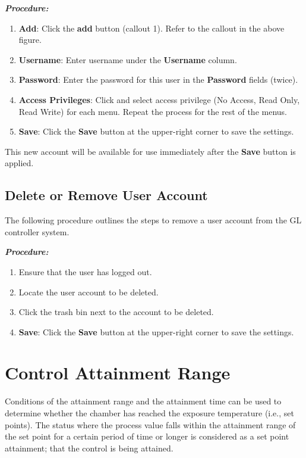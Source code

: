 \textbf{\emph{Procedure:}}

\begin{enumerate}
\def\labelenumi{\arabic{enumi}.}
\tightlist
\item
  \textbf{Add}: Click the \textbf{add} button (callout 1). Refer to the
  callout in the above figure.\\
\item
  \textbf{Username}: Enter username under the \textbf{Username}
  column.\\
\item
  \textbf{Password}: Enter the password for this user in the
  \textbf{Password} fields (twice).
\item
  \textbf{Access Privileges}: Click and select access privilege (No
  Access, Read Only, Read Write) for each menu. Repeat the process for
  the rest of the menus.
\item
  \textbf{Save}: Click the \textbf{Save} button at the upper-right
  corner to save the settings.
\end{enumerate}

This new account will be available for use immediately after the
\textbf{Save} button is applied.


\subsection{Delete or Remove User
Account}

The following procedure outlines the steps to remove a user account from
the GL controller system.

\textbf{\emph{Procedure:}}

\begin{enumerate}
\def\labelenumi{\arabic{enumi}.}
\item
  Ensure that the user has logged out.
\item
  Locate the user account to be deleted.
\item
  Click the trash bin next to the account to be deleted.
\item
  \textbf{Save}: Click the \textbf{Save} button at the upper-right
  corner to save the settings.
\end{enumerate}


\section{Control Attainment
Range}

Conditions of the attainment range and the attainment time can be used
to determine whether the chamber has reached the exposure temperature
(i.e., set points). The status where the process value falls within the
attainment range of the set point for a certain period of time or longer
is considered as a set point attainment; that the control is being
attained.

